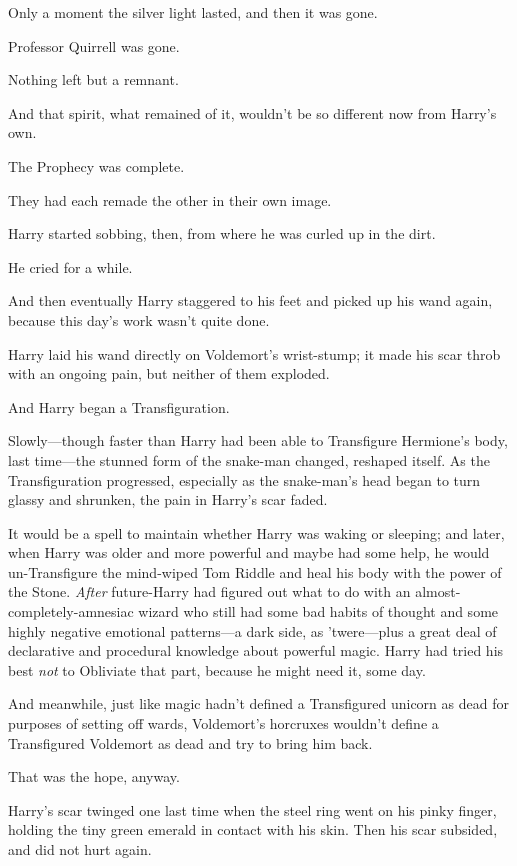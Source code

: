 Only a moment the silver light lasted, and then it was gone.

Professor Quirrell was gone.

Nothing left but a remnant.

And that spirit, what remained of it, wouldn’t be so different now from Harry’s own.

The Prophecy was complete.

They had each remade the other in their own image.

Harry started sobbing, then, from where he was curled up in the dirt.

He cried for a while.

And then eventually Harry staggered to his feet and picked up his wand again, because this day’s work wasn’t quite done.

\later

Harry laid his wand directly on Voldemort’s wrist-stump; it made his scar throb with an ongoing pain, but neither of them exploded.

And Harry began a Transfiguration.

Slowly—though faster than Harry had been able to Transfigure Hermione’s body, last time—the stunned form of the snake-man changed, reshaped itself. As the Transfiguration progressed, especially as the snake-man’s head began to turn glassy and shrunken, the pain in Harry’s scar faded.

It would be a spell to maintain whether Harry was waking or sleeping; and later, when Harry was older and more powerful and maybe had some help, he would un-Transfigure the mind-wiped Tom Riddle and heal his body with the power of the Stone. \emph{After} future-Harry had figured out what to do with an almost-completely-amnesiac wizard who still had some bad habits of thought and some highly negative emotional patterns—a dark side, as ’twere—plus a great deal of declarative and procedural knowledge about powerful magic. Harry had tried his best \emph{not} to Obliviate that part, because he might need it, some day.

And meanwhile, just like magic hadn’t defined a Transfigured unicorn as dead for purposes of setting off wards, Voldemort’s horcruxes wouldn’t define a Transfigured Voldemort as dead and try to bring him back.

That was the hope, anyway.

Harry’s scar twinged one last time when the steel ring went on his pinky finger, holding the tiny green emerald in contact with his skin. Then his scar subsided, and did not hurt again.

